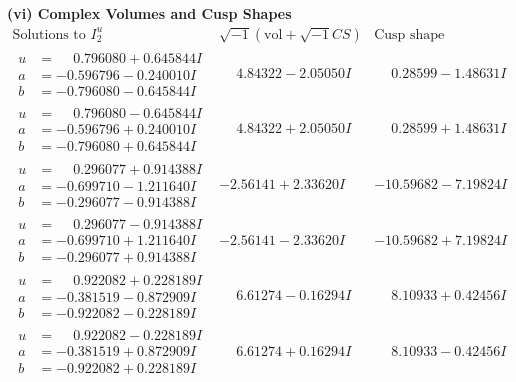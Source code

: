 \documentclass[1p]{elsarticle_modified}
\theoremstyle{definition}
\newcommand{\I}{\sqrt{-1}}
\begin{document}
\newpage\flushleft \textbf{(vi) Complex Volumes and Cusp Shapes}
$$\begin{array}{c|c|c}  
\text{Solutions to }I^u_{2}& \I (\text{vol} + \sqrt{-1}CS) & \text{Cusp shape}\\
 \hline 
\begin{aligned}
u &= \phantom{-}0.796080 + 0.645844 I \\
a &= -0.596796 - 0.240010 I \\
b &= -0.796080 - 0.645844 I\end{aligned}
 & \phantom{-}4.84322 - 2.05050 I & \phantom{-}0.28599 - 1.48631 I \\ \hline\begin{aligned}
u &= \phantom{-}0.796080 - 0.645844 I \\
a &= -0.596796 + 0.240010 I \\
b &= -0.796080 + 0.645844 I\end{aligned}
 & \phantom{-}4.84322 + 2.05050 I & \phantom{-}0.28599 + 1.48631 I \\ \hline\begin{aligned}
u &= \phantom{-}0.296077 + 0.914388 I \\
a &= -0.699710 - 1.211640 I \\
b &= -0.296077 - 0.914388 I\end{aligned}
 & -2.56141 + 2.33620 I & -10.59682 - 7.19824 I \\ \hline\begin{aligned}
u &= \phantom{-}0.296077 - 0.914388 I \\
a &= -0.699710 + 1.211640 I \\
b &= -0.296077 + 0.914388 I\end{aligned}
 & -2.56141 - 2.33620 I & -10.59682 + 7.19824 I \\ \hline\begin{aligned}
u &= \phantom{-}0.922082 + 0.228189 I \\
a &= -0.381519 - 0.872909 I \\
b &= -0.922082 - 0.228189 I\end{aligned}
 & \phantom{-}6.61274 - 0.16294 I & \phantom{-}8.10933 + 0.42456 I \\ \hline\begin{aligned}
u &= \phantom{-}0.922082 - 0.228189 I \\
a &= -0.381519 + 0.872909 I \\
b &= -0.922082 + 0.228189 I\end{aligned}
 & \phantom{-}6.61274 + 0.16294 I & \phantom{-}8.10933 - 0.42456 I \\ \hline\begin{aligned}

\end{aligned}
\end{array}$$
\end{document}
